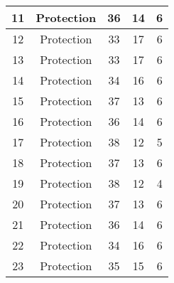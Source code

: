 \documentclass[results.tex]{subfiles}
\begin{document}
\begin{center}
\begin{tabular}{| c || c | c | c | c |}
            \hline
            11                      & Protection                   & 36                     & 14                      & 6                    \\
            \hline
            12                      & Protection                   & 33                     & 17                      & 6                    \\
            \hline
            13                      & Protection                   & 33                     & 17                      & 6                    \\
            \hline
            14                      & Protection                   & 34                     & 16                      & 6                    \\
            \hline
            15                      & Protection                   & 37                     & 13                      & 6                    \\
            \hline
            16                      & Protection                   & 36                     & 14                      & 6                    \\
            \hline
            17                      & Protection                   & 38                     & 12                      & 5                    \\
            \hline
            18                      & Protection                   & 37                     & 13                      & 6                    \\
            \hline
            19                      & Protection                   & 38                     & 12                      & 4                    \\
            \hline
            20                      & Protection                   & 37                     & 13                      & 6                    \\
            \hline
            21                      & Protection                   & 36                     & 14                      & 6                    \\
            \hline
            22                      & Protection                   & 34                     & 16                      & 6                    \\
            \hline
            23                      & Protection                   & 35                     & 15                      & 6                    \\

\end{tabular}
\end{center}
\end{document}
